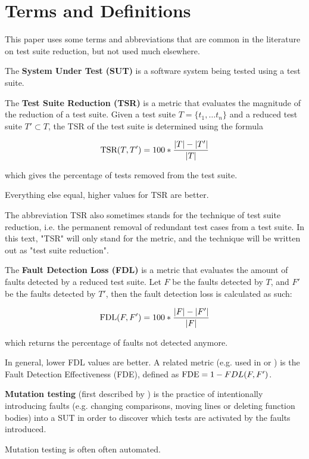 
\chapter{Terms and Definitions}\label{chapter:terms}

This paper uses some terms and abbreviations that are common in the
literature on test suite reduction, but not used much elsewhere.

The \textbf{System Under Test (SUT)} is a software system being tested
using a test suite.

The \textbf{Test Suite Reduction (TSR)} is a metric that evaluates the
magnitude of the reduction of a test suite. Given a test suite $T=\{t_1,
\dots t_n\}$ and a reduced test suite $T' \subset T$, the TSR of the
test suite is determined using the formula

$$\hbox{TSR}(T, T')=100*\frac{|T|-|T'|}{|T|}$$

which gives the percentage of tests removed from the test suite.

Everything else equal, higher values for TSR are better.

The abbreviation TSR also sometimes stands for the technique of test
suite reduction, i.e. the permanent removal of redundant test cases
from a test suite. In this text, "TSR" will only stand for the metric,
and the technique will be written out as "test suite reduction".

The \textbf{Fault Detection Loss (FDL)} is a metric that evaluates the
amount of faults detected by a reduced test suite. Let $F$ be the faults
detected by $T$, and $F'$ be the faults detected by $T'$, then the fault
detection loss is calculated as such:

$$\hbox{FDL}(F, F')=100*\frac{|F|-|F'|}{|F|}$$

which returns the percentage of faults not detected anymore.

In general, lower FDL values are better. A related metric (e.g. used in
\cite{khan2016survey} or \cite{yoo2012regression}) is the Fault Detection
Effectiveness (FDE), defined as $\hbox{FDE}=1-FDL(F, F')$.

\textbf{Mutation testing} (first described by \cite{budd1980mutation})
is the practice of intentionally introducing faults (e.g. changing
comparisons, moving lines or deleting function bodies) into a SUT in
order to discover which tests are activated by the faults introduced.

Mutation testing is often often automated.
